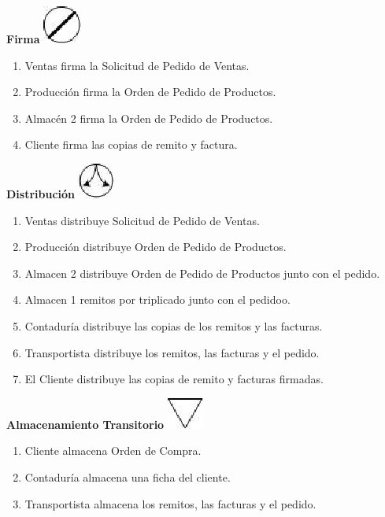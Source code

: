 \begin{center}
  \textbf{Firma}
  \includegraphics{./Images/Simbolos/simbolo-Firma.png}
\end{center}
\begin{enumerate}
  \item Ventas firma la Solicitud de Pedido de Ventas.
  \item Producción firma la Orden de Pedido de Productos.
  \item Almacén 2 firma la Orden de Pedido de Productos.
  \item Cliente firma las copias de remito y factura.
\end{enumerate}

\begin{center}
  \textbf{Distribución}
  \includegraphics{./Images/Simbolos/simbolo-Distribucion.png}
\end{center}
\begin{enumerate}
  \item Ventas distribuye Solicitud de Pedido de Ventas.
  \item Producción distribuye Orden de Pedido de Productos.
  \item Almacen 2 distribuye Orden de Pedido de Productos junto con el pedido.
  \item Almacen 1 remitos por triplicado junto con el pedidoo.
  \item Contaduría distribuye las copias de los remitos y las facturas.
  \item Transportista distribuye los remitos, las facturas y el pedido.
  \item El Cliente distribuye las copias de remito y facturas firmadas.
\end{enumerate}

\begin{center}
  \textbf{Almacenamiento Transitorio}
  \includegraphics{./Images/Simbolos/simbolo-Almacenamiento-Transitorio.png}
\end{center}
\begin{enumerate}
  \item Cliente almacena Orden de Compra.
  \item Contaduría almacena una ficha del cliente.
  \item Transportista almacena los remitos, las facturas y el pedido.
\end{enumerate}


